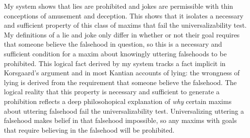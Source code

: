 \begin{isabellebody}
%
%
\endisatagproof
{\isafoldproof}%
%
\isadelimproof
%
\endisadelimproof
%
\begin{isamarkuptext}%
My system shows that lies are prohibited and jokes are permissible with thin 
conceptions of amusement and deception. This shows that it isolates a necessary and sufficient property 
of this class of maxims that fail the universalizability test. My definitions of a lie and joke
only differ in whether or not their goal requires that someone believe the falsehood in question, so
this is a necessary and sufficient condition for a maxim about knowingly uttering falsehoods to be prohibited.
This logical fact derived by my system tracks a fact implicit in Korsgaard's argument and in most Kantian accounts
of lying: the wrongness of lying is derived from the requirement that someone believe the falsehood. 
The logical reality that this property is necessary and sufficient to generate a prohibition reflects
a deep philosohopical explanation of \emph{why} certain maxims about uttering falsehood fail the universalizability
test. Universalizing uttering a falsehood makes belief in that 
falsehood impossible, so any maxims with goals that require believing in the falsehood will be prohibited.


\end{isamarkuptext}
\end{isabellebody}
